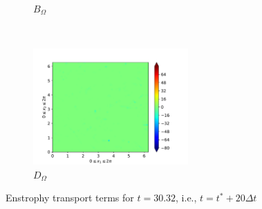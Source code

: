 \begin{figure}[H]
\begin{subfigure}{0.45\textwidth}
        \caption{$B_{\Omega}$}
    \end{subfigure}
    ~
    \begin{subfigure}{0.45\textwidth}
        \includegraphics[height=1.75in]{media/run-cds-65/D-enst-1360}
        \caption{$D_{\Omega}$}
    \end{subfigure}
    \caption{Enstrophy transport terms for $t=30.32$, i.e., $t=t^{\ast} + 20 \Delta t$}
\end{figure}

\newpage

